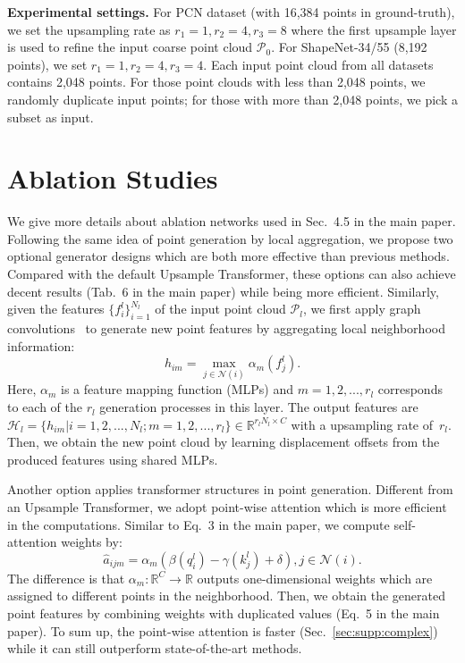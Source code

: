 \vspace{5pt}
\noindent\textbf{Experimental settings.} For PCN dataset (with 16,384 points in ground-truth), we set the upsampling rate as $r_1=1, r_2=4, r_3=8$ where the first upsample layer is used to refine the input coarse point cloud $\mathcal{P}_0$. For ShapeNet-34/55 (8,192 points), we set $r_1=1, r_2=4, r_3=4$. Each input point cloud from all datasets contains 2,048 points. For those point clouds with less than 2,048 points, we randomly duplicate input points; for those with more than 2,048 points, we pick a subset as input. 

\section{Ablation Studies}
\label{sec:supp:ablation}
We give more details about ablation networks used in Sec.~4.5 in the main paper.
Following the same idea of point generation by local aggregation, we propose two optional generator designs which are both more effective than previous methods. Compared with the default Upsample Transformer, these options can also achieve decent results (Tab.~6 in the main paper) while being more efficient. Similarly, given the features $\{f_i^l\}_{i=1}^{N_l}$ of the input point cloud $\mathcal{P}_l$, we first apply graph convolutions~\cite{wang2019dynamic} to generate new point features by aggregating local neighborhood information:
\begin{equation}
	h_{im} = \max_{j \in \mathcal{N}(i)} \alpha_m(f_j^l).
\end{equation}
Here, $\alpha_m$ is a feature mapping function (MLPs) and $m=1,2,...,r_l$ corresponds to each of the $r_l$ generation processes in this layer. The output features are $\mathcal{H}_l = \{h_{im} | i = 1,2,...,N_l; m = 1,2,...,r_l\} \in \mathbb{R}^{r_l N_l \times C}$ with a upsampling rate of~$r_l$. Then, we obtain the new point cloud by learning displacement offsets from the produced features using shared MLPs.

Another option applies transformer structures in point generation. Different from an Upsample Transformer, we adopt point-wise attention which is more efficient in the computations. Similar to Eq.~3 in the main paper, we compute self-attention weights by:
\begin{equation}
	\hat{a}_{ijm} = \alpha_m(\beta(q_i^l) - \gamma(k_j^l) + \delta), j \in \mathcal{N}(i).
\end{equation}
The difference is that $\alpha_m: \mathbb{R}^C \rightarrow \mathbb{R}$ outputs one-dimensional weights which are assigned to different points in the neighborhood. Then, we obtain the generated point features by combining weights with duplicated values (Eq.~5 in the main paper). To sum up, the point-wise attention is faster (Sec.~\ref{sec:supp:complex}) while it can still outperform state-of-the-art methods.

